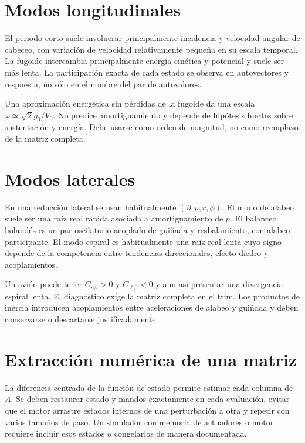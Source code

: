 \section{Modos longitudinales}
El periodo corto suele involucrar principalmente incidencia y velocidad angular de cabeceo, con variación de velocidad relativamente pequeña en su escala temporal. La fugoide intercambia principalmente energía cinética y potencial y suele ser más lenta. La participación exacta de cada estado se observa en autovectores y respuesta, no sólo en el nombre del par de autovalores.

Una aproximación energética sin pérdidas de la fugoide da una escala $\omega\simeq\sqrt2g_0/V_0$. No predice amortiguamiento y depende de hipótesis fuertes sobre sustentación y energía. Debe usarse como orden de magnitud, no como reemplazo de la matriz completa.


\section{Modos laterales}
En una reducción lateral se usan habitualmente $(\beta,p,r,\phi)$. El modo de alabeo suele ser una raíz real rápida asociada a amortiguamiento de $p$. El balanceo holandés es un par oscilatorio acoplado de guiñada y resbalamiento, con alabeo participante. El modo espiral es habitualmente una raíz real lenta cuyo signo depende de la competencia entre tendencias direccionales, efecto diedro y acoplamientos.

Un avión puede tener $C_{n\beta}>0$ y $C_{\ell\beta}<0$ y aun así presentar una divergencia espiral lenta. El diagnóstico exige la matriz completa en el trim. Los productos de inercia introducen acoplamientos entre aceleraciones de alabeo y guiñada y deben conservarse o descartarse justificadamente.

\section{Extracción numérica de una matriz}
La diferencia centrada de la función de estado permite estimar cada columna de $A$. Se deben restaurar estado y mandos exactamente en cada evaluación, evitar que el motor arrastre estados internos de una perturbación a otra y repetir con varios tamaños de paso. Un simulador con memoria de actuadores o motor requiere incluir esos estados o congelarlos de manera documentada.

